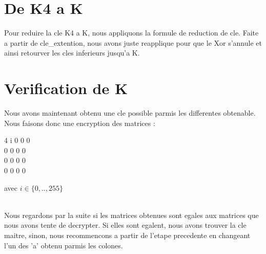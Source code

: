 \documentclass[10pt, a4paper]{report}
\begin{document}
	\section{De K4 a K}
	Pour reduire la cle K4 a K, nous appliquons la formule de reduction de cle. Faite a partir de cle\_extention, nous avons juste reapplique pour que le Xor s'annule et ainsi retourver les cles inferieurs jusqu'a K.
	
	\section{Verification de K}
	Nous avons maintenant obtenu une cle possible parmis les differentes obtenable. Nous faisons donc une encryption des matrices : \\
	\begin{center}
		\begin{tabular}{4}
			i 0 0 0 \\ 0 0 0 0 \\ 0 0 0 0\\ 0 0 0 0\\
		\end{tabular}
		avec \begin{math}
			i \in \{0,..,255\}
		\end{math} 
	\end{center}\\
	Nous regardons par la suite si les matrices obtenues sont egales aux matrices que nous avons tente de decrypter. Si elles sont egalent, nous avons trouver la cle maitre, sinon, nous recommencons  a partir de l'etape precedente en changeant l'un des 'a' obtenu parmis les colones.
\end{document}
